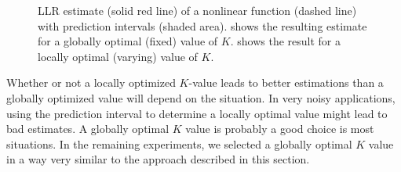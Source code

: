 \begin{figure}[htbp]
\centering
{} 
\caption[\ac{LLR} estimate of a nonlinear function]{\ac{LLR} estimate (solid red line) of a nonlinear function (dashed line) with prediction intervals (shaded area).  shows the resulting estimate for a globally optimal (fixed) value of $K$.  shows the result for a locally optimal (varying) value of $K$.}
\label{fig:LLR-nonlinfunction_K_local_global}
\end{figure}

Whether or not a locally optimized $K$-value leads to better estimations than a globally optimized value will depend on the situation. In very noisy applications, using the prediction interval to determine a locally optimal value might lead to bad estimates. A globally optimal $K$ value is probably a good choice is most situations. In the remaining experiments, we selected a globally optimal $K$ value in a way very similar to the approach described in this section. 





